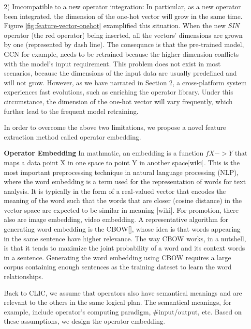 2) Imcompatible to a new operator integration: 
In particular, as a new operator been integrated, the dimension of the one-hot vector will grow in the same time. 
Figure \ref{fig:feature-vector-onehot} examplified this situation. 
When the new \textit{SIN} operator (the red operator) being inserted, all the vectors' dimensions are grown by one (represented by dash line).
The consequnce is that the pre-trained model, GCN for example, needs to be retrained because the higher dimension conflicts with the model's input requirement.
This problem does not exist in most scenarios, because the dimensions of the input data are usually predefined and will not grow.
However, as we have narrated in Section 2, a cross-platform system experiences fast evolutions, such as enriching the operator library.
Under this circumstance, the dimension of the one-hot vector will vary frequently, which further lead to the frequent model retraining.


In order to overcome the above two limitations, we propose a novel feature extraction method called operator embedding.

\textbf{Operator Embedding}
In mathmatic, an embedding is a function $f X -> Y$ that maps a data point X in one space to point Y in another space[wiki]. 
This is the most important preprocessing technique in natural language processing (NLP), where the word embedding is a term used for the representation of words for text analysis. 
It is typically in the form of a real-valued vector that encodes the meaning of the word such that the words that are closer (cosine distance) in the vector space are expected to be similar in meaning [wiki]. 
For promotion, there also are image embedding, video embedding. 
A representative algorithm for generating word embedding is the CBOW[], whose idea is that words appearing in the same sentence have higher relevance. 
The way CBOW works, in a nutshell, is that it tends to maximize the joint probability of a word and its context words in a sentence. 
Generating the word embedding using CBOW requires a large corpus containing enough sentences as the training dateset to learn the word relationships.

Back to CLIC, we assume that operators also have semantical meanings and are relevant to the others in the same logical plan.
The semantical meanings, for example, include operator's computing paradigm, \#input/output, etc.
Based on these assumptions, we design the operator embedding.

